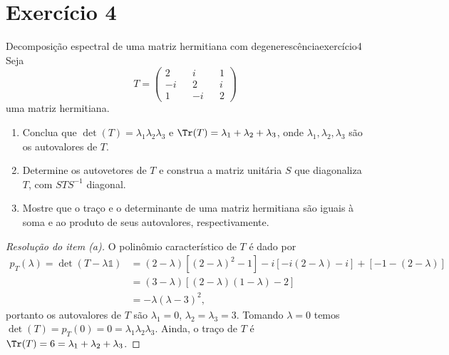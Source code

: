 \section*{Exercício 4}
\begin{exercício}{Decomposição espectral de uma matriz hermitiana com degenerescência}{exercício4}
    Seja
    \begin{equation*}
        T = \begin{pmatrix}
            2 && i && 1\\
            -i&& 2 && i\\
            1 &&-i && 2
        \end{pmatrix}
    \end{equation*}
    uma matriz hermitiana.
    \begin{enumerate}[label=(\alph*)]
        \item Conclua que \(\det(T) = \lambda_1 \lambda_2 \lambda_3\) e \(\Tr(T) = \lambda_1 + \lambda_2 + \lambda_3\), onde \(\lambda_1, \lambda_2, \lambda_3\) são os autovalores de \(T\).
        \item Determine os autovetores de \(T\) e construa a matriz unitária \(S\) que diagonaliza \(T\), com \(S T S^{-1}\) diagonal.
        \item Mostre que o traço e o determinante de uma matriz hermitiana são iguais à soma e ao produto de seus autovalores, respectivamente.
    \end{enumerate}
\end{exercício}
\begin{proof}[Resolução do item (a)]
    O polinômio característico de \(T\) é dado por
    \begin{align*}
        p_T(\lambda) = \det(T - \lambda \mathds{1}) &= (2 - \lambda)\left[(2 - \lambda)^2 - 1\right] -i \left[-i(2 - \lambda) - i\right] + \left[-1 - (2 - \lambda)\right]\\
                                                    &= \left(3 - \lambda\right)\left[(2 - \lambda)(1 - \lambda) - 2\right]\\
                                                    &= -\lambda(\lambda - 3)^2,
    \end{align*}
    portanto os autovalores de \(T\) são \(\lambda_1 = 0\), \(\lambda_2 = \lambda_3 = 3\). Tomando \(\lambda = 0\) temos \(\det(T) = p_T(0) = 0 = \lambda_1 \lambda_2 \lambda_3\). Ainda, o traço de \(T\) é \(\Tr(T) = 6 = \lambda_1 + \lambda_2 + \lambda_3\).
\end{proof}
